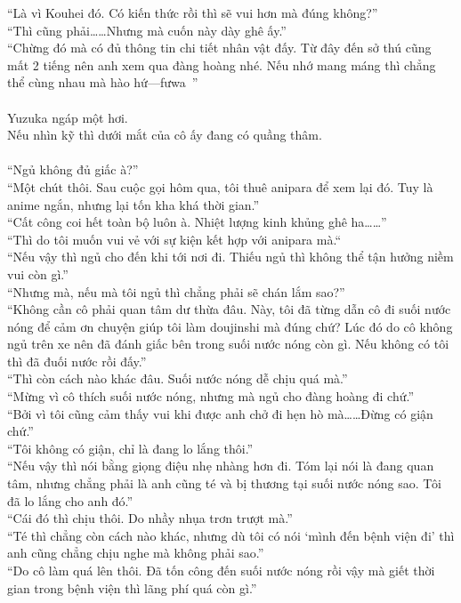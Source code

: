 \documentclass[12pt,a4paper, twosides]{book}
\begin{document}
“Là vì Kouhei đó. Có kiến thức rồi thì sẽ vui hơn mà đúng không?”\\
“Thì cũng phải……Nhưng mà cuốn này dày ghê ấy.”\\
“Chừng đó mà có đủ thông tin chi tiết nhân vật đấy. Từ đây đến sở thú cũng mất 2 tiếng nên anh xem qua đàng hoàng nhé. Nếu nhớ mang máng thì chẳng thể cùng nhau mà hào hứ—fưwa~”\\
\\
Yuzuka ngáp một hơi.\\
Nếu nhìn kỹ thì dưới mắt của cô ấy đang có quầng thâm.\\
\\
“Ngủ không đủ giấc à?”\\
“Một chút thôi. Sau cuộc gọi hôm qua, tôi thuê anipara để xem lại đó. Tuy là anime ngắn, nhưng lại tốn kha khá thời gian.”\\
“Cất công coi hết toàn bộ luôn à. Nhiệt lượng kinh khủng ghê ha……”\\
“Thì do tôi muốn vui vẻ với sự kiện kết hợp với anipara mà.“\\
“Nếu vậy thì ngủ cho đến khi tới nơi đi. Thiếu ngủ thì không thể tận hưởng niềm vui còn gì.”\\
“Nhưng mà, nếu mà tôi ngủ thì chẳng phải sẽ chán lắm sao?”\\
“Không cần cô phải quan tâm dư thừa đâu. Này, tôi đã từng dẫn cô đi suối nước nóng để cảm ơn chuyện giúp tôi làm doujinshi mà đúng chứ? Lúc đó do cô không ngủ trên xe nên đã đánh giấc bên trong suối nước nóng còn gì. Nếu không có tôi thì đã đuối nước rồi đấy.”\\
“Thì còn cách nào khác đâu. Suối nước nóng dễ chịu quá mà.”\\
“Mừng vì cô thích suối nước nóng, nhưng mà ngủ cho đàng hoàng đi chứ.”\\
“Bởi vì tôi cũng cảm thấy vui khi được anh chở đi hẹn hò mà……Đừng có giận chứ.”\\
“Tôi không có giận, chỉ là đang lo lắng thôi.”\\
“Nếu vậy thì nói bằng giọng điệu nhẹ nhàng hơn đi. Tóm lại nói là đang quan tâm, nhưng chẳng phải là anh cũng té và bị thương tại suối nước nóng sao. Tôi đã lo lắng cho anh đó.”\\
“Cái đó thì chịu thôi. Do nhầy nhụa trơn trượt mà.”\\
“Té thì chẳng còn cách nào khác, nhưng dù tôi có nói ‘mình đến bệnh viện đi’ thì anh cũng chẳng chịu nghe mà không phải sao.”\\
“Do cô làm quá lên thôi. Đã tốn công đến suối nước nóng rồi vậy mà giết thời gian trong bệnh viện thì lãng phí quá còn gì.”\\
\end{document}
